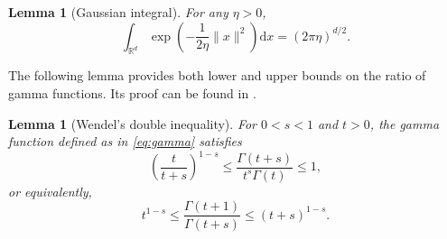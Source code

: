 \documentclass[11pt,letterpaper]{article}
\newtheorem{lemma}[thm]{Lemma}
\newcommand{\R}{\mathbb{R}}
\newcommand{\rd}{\mathrm{d}}
\begin{document}
\begin{lemma}[Gaussian integral]\label{lem:Gaussian}
For any $\eta>0$,
    \[
    \int_{\R^d} \exp\left(-\frac{1}{2\eta}\|x\|^2\right) \rd x = (2\pi \eta)^{d/2}.
    \]
\end{lemma}

The following lemma provides both lower and upper bounds on the ratio of gamma functions. Its proof can be found in \cite{wendel1948note}.

\begin{lemma}[Wendel's double inequality]
For $0<s<1$ and $t>0$, the gamma function defined as in \eqref{eq:gamma}
satisfies 
\[
\left(\frac{t}{t+s}\right)^{1-s} \le \frac{\Gamma(t+s)}{t^s \Gamma(t)} \le 1,
\]
or equivalently,
\begin{equation}\label{ineq:Wendel}
    t^{1-s} \le \frac{\Gamma(t+1)}{\Gamma(t+s)} \le (t+s)^{1-s}.
\end{equation}
\end{lemma}
\end{document}
